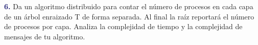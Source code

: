 \newpage
\textbf{\textcolor{MidnightBlue}{6.}}
Da un algoritmo distribuido para contar el
número de procesos en cada capa de un árbol
enraizado T de forma separada. Al final la
raíz reportará el número de procesos por capa.
Analiza la complejidad de tiempo y la complejidad
de mensajes de tu algoritmo. 
